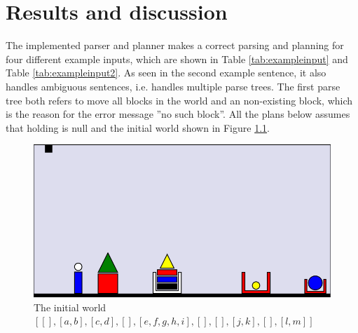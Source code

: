 \chapter{Results and discussion}
The implemented parser and planner makes a correct parsing and planning for
four different example inputs, which are shown in Table \ref{tab:exampleinput}
and Table \ref{tab:exampleinput2}. As seen in the second example sentence, it
also handles ambiguous sentences, i.e. handles multiple parse trees. The first
parse tree both refers to move all blocks in the world and an non-existing
block, which is the reason for the error message ''no such block''. All the
plans below assumes that holding is null and the initial world shown in
Figure \ref{fig:initworld}.\\
\begin{figure}[h!]
\centering
\includegraphics[scale = 0.4]{fig/1.png}
\caption{The initial world\\ $[[],[a,b],[c,d], [], [e,f,g,h,i],[],[],[j,k], [], [l,m]]$}
\label{fig:initworld}
\end{figure}\\
